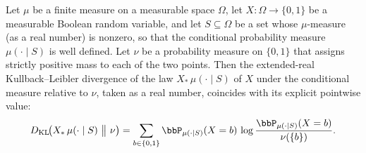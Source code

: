 \begin{theorem}
\label{ProbabilityTheory.toReal_klDiv_map_bool_eq_KLDiv_of_measureReal_ne_zero}
\leanok
{}
Let $\mu$ be a finite measure on a measurable space $\Omega$, let $X:\Omega\to\{0,1\}$
be a measurable Boolean random variable, and let $S\subseteq\Omega$ be a set whose
$\mu$-measure (as a real number) is nonzero, so that the conditional probability measure
$\mu(\cdot\mid S)$ is well defined. Let $\nu$ be a probability measure on $\{0,1\}$ that
assigns strictly positive mass to each of the two points. Then the extended-real
Kullback–Leibler divergence of the law $X_{\ast}\,\mu(\cdot\mid S)$ of $X$ under the
conditional measure relative to $\nu$, taken as a real number, coincides with its
explicit pointwise value:
\[
D_{\mathrm{KL}}\!\bigl(X_{\ast}\,\mu(\cdot\mid S)\ \big\|\ \nu\bigr)
= \sum_{b\in\{0,1\}} \bbP_{\mu(\cdot\mid S)}(X=b)\,
\log\frac{\bbP_{\mu(\cdot\mid S)}(X=b)}{\nu(\{b\})}.
\]
\end{theorem}
